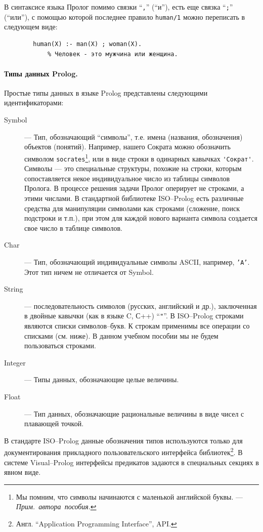 \documentclass[12pt, openany, twoside]{book} %
\def\AR{{\em Прим.~автора~пособия}}
\begin{document}
В синтаксисе языка Пролог помимо связки ``{\tt ,}'' (``и''), есть еще связка ``{\tt ;}'' (``или''), с помощью которой последнее правило {\tt human/1} можно переписать в следующем виде:
{\tt\begin{verbatim}
        human(Х) :- man(Х) ; woman(Х).
            % Человек - это мужчина или женщина.
\end{verbatim}}

\paragraph{Типы данных Prolog.} Простые типы данных в языке Prolog представлены следующими идентификаторами:
\begin{description}
\item[Symbol] --- Тип, обозначающий ``символы'', т.е. имена (названия, обозначения) объектов (понятий). Например, нашего Сократа можно обозначить символом {\tt socrates}\footnote{Мы помним, что символы начинаются с маленькой английской буквы. --- \AR.}, или в виде строки в одинарных кавычках {\tt \verb|'Сократ'|}. Символы --- это специальные структуры, похожие на строки, которым сопоставляется некое индивидуальное число из таблицы символов Пролога. В процессе решения задачи Пролог оперирует не строками, а этими числами. В стандартной библиотеке ISO--Prolog есть различные средства для манипуляции символами как строками (сложение, поиск подстроки и т.п.), при этом для каждой нового варианта символа создается свое число в таблице символов.

\item[Char] --- Тип, обозначающий индивидуальные символы ASCII, например, {\tt 'A'}. Этот тип ничем не отличается от Symbol.

\item[String] --- последовательность символов (русских, английский и др.), заключенная в двойные кавычки (как в языке C, С++) ``{\tt \verb|"|}''. В ISO--Prolog строками являются списки символов--букв. К строкам применимы все операции со списками (см. ниже). В данном учебном пособии мы не будем пользоваться строками.

\item[Integer] --- Типы данных, обозначающие целые величины.
\item[Float] --- Тип данных, обозначающие рациональные величины в виде чисел с плавающей точкой.
\end{description}
В стандарте ISO--Prolog данные обозначения типов используются только для документирования прикладного пользовательского интерфейса библиотек\footnote{Англ. ``Application Programming Interface'', API.}. В системе Visual--Prolog интерфейсы предикатов задаются в специальных секциях в явном виде.
\end{document}
